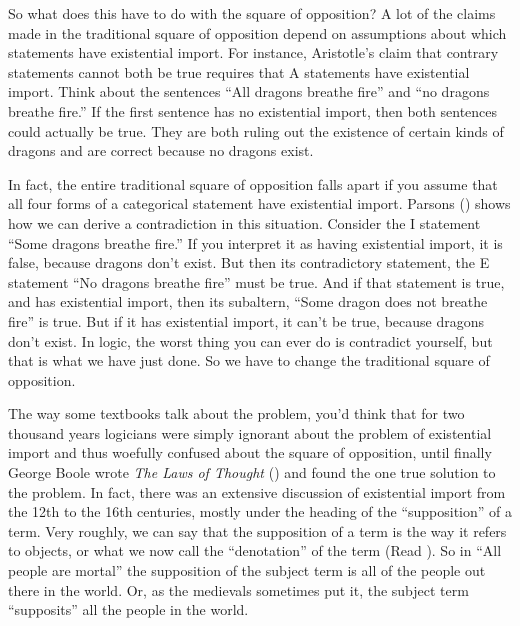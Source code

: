 So what does this have to do with the square of opposition? A lot of the claims made in the traditional square of opposition depend on assumptions about which statements have existential import. For instance, Aristotle's claim that contrary statements cannot both be true requires that A statements have existential import. Think about the sentences ``All dragons breathe fire'' and ``no dragons breathe fire.'' If the first sentence has no existential import, then both sentences could actually be true. They are both ruling out the existence of certain kinds of dragons and are correct because no dragons exist. 

In fact, the entire traditional square of opposition falls apart if you assume that all four forms of a categorical statement have existential import. Parsons (\citeyear{Parsons1997}) shows how we can derive a contradiction in this situation. Consider the I statement ``Some dragons breathe fire.'' If you interpret it as having existential import, it is false, because dragons don't exist. But then its contradictory statement, the E statement ``No dragons breathe fire'' must be true. And if that statement is true, and has existential import, then its subaltern, ``Some dragon does not breathe fire'' is true. But if it has existential import, it can't be true, because dragons don't exist. In logic, the worst thing you can ever do is contradict yourself, but that is what we have just done. So we have to change the traditional square of opposition.

 The way some textbooks talk about the problem, you'd think that for two thousand years logicians were simply ignorant about the problem of existential import and thus woefully confused about the square of opposition, until finally George Boole wrote \textit{The Laws of Thought} (\citeyear{Boole1854}) and found the one true solution to the problem. In fact, there was an extensive discussion of existential import from the 12th to the 16th centuries, mostly under the heading of the ``supposition'' of a term. Very roughly, we can say that the supposition of a term is the way it refers to objects, or what we now call the ``denotation'' of the term (Read \citeyear{Read2002}).  So in ``All people are mortal'' the supposition of the subject term is all of the people out there in the world. Or, as the medievals sometimes put it, the subject term ``supposits'' all the people in the world.
 
